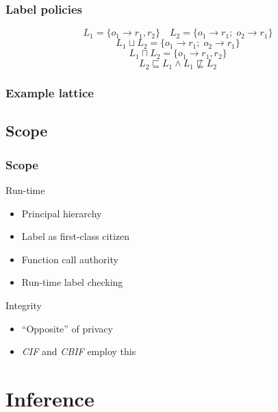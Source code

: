 \documentclass[10pt]{beamer}
\newcommand{\ipol}[1]{}
\begin{document}
\begin{frame}
  \frametitle{Label policies}
  \centering

  \newcommand{\mathvspace}{\\[2em]}
    \[ L_1 = \{ o_1 \rightarrow r_1, r_2 \ipol{; \; o_2 \rightarrow r_1, r_2} \} \quad L_2 = \{ o_1 \rightarrow r_1 ; \; o_2 \rightarrow r_1 \} \]
    \[ L_1 \sqcup L_2  = \{ o_1 \rightarrow r_1 ; \; o_2 \rightarrow r_1 \} \]
    \[ L_1 \sqcap L_2  = \{ o_1 \rightarrow r_1, r_2 \ipol{; \; o_2 \rightarrow r_1, r_2 } \} \]
    \[ L_2 \sqsubseteq L_1 \land L_1 \not\sqsubseteq L_2 \]
  \end{frame}

\begin{frame}
  \frametitle{Example lattice}
  \scalebox{0.5}{}
\end{frame}

\subsection{Scope}
\begin{frame}
  \frametitle{Scope}

  Run-time
  \begin{itemize}
    \item Principal hierarchy
    \item Label as first-class citizen
    \item Function call authority
    \item Run-time label checking
  \end{itemize}
  \vspace{1em}
  Integrity
  \begin{itemize}
    \item ``Opposite'' of privacy
    \item \emph{CIF} and \emph{CBIF} employ this
  \end{itemize}
\end{frame}

\section{Inference}
\end{document}
